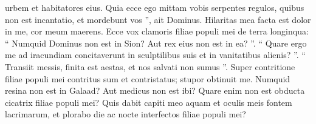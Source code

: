 \begin{biblechapter}
\begin{biblechapter}
\begin{biblechapter}
\begin{biblechapter}
\begin{biblechapter}
\begin{biblechapter}
\begin{biblechapter}
\begin{biblechapter}
 urbem et habitatores eius.
 \verse Quia ecce ego mittam vobis
 serpentes regulos,
 quibus non est incantatio,
 et mordebunt vos ”,
 ait Dominus.
 \verse Hilaritas mea facta est dolor in me,
 cor meum maerens.
 \verse Ecce vox clamoris filiae populi mei
 de terra longinqua:
 “ Numquid Dominus non est in Sion?
 Aut rex eius non est in ea? ”.
 “ Quare ergo me ad iracundiam concitaverunt in sculptilibus suis
 et in vanitatibus alienis? ”.
 \verse “ Transiit messis, finita est aestas,
 et nos salvati non sumus ”.
 \verse Super contritione filiae populi mei
 contritus sum et contristatus;
 stupor obtinuit me.
 \verse Numquid resina non est in Galaad?
 Aut medicus non est ibi?
 Quare enim non est obducta
 cicatrix filiae populi mei?
 \verse Quis dabit capiti meo aquam
 et oculis meis fontem lacrimarum,
 et plorabo die ac nocte
 interfectos filiae populi mei?
 

\end{biblechapter}
\end{biblechapter}
\end{biblechapter}
\end{biblechapter}
\end{biblechapter}
\end{biblechapter}
\end{biblechapter}
\end{biblechapter}
